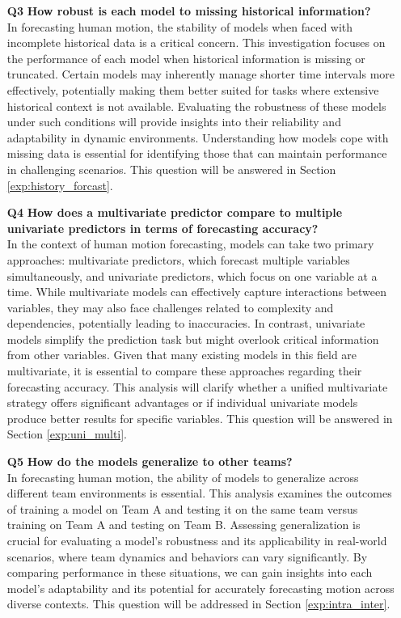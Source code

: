 \begin{itemize}
    
\item[\textbf{Q3}] \textbf{How robust is each model to missing historical information?} \\
In forecasting human motion, the stability of models when faced with incomplete historical data is a critical concern. This investigation focuses on the performance of each model when historical information is missing or truncated. Certain models may inherently manage shorter time intervals more effectively, potentially making them better suited for tasks where extensive historical context is not available. Evaluating the robustness of these models under such conditions will provide insights into their reliability and adaptability in dynamic environments. Understanding how models cope with missing data is essential for identifying those that can maintain performance in challenging scenarios. This question will be answered in Section \ref{exp:history_forcast}.


\item[\textbf{Q4}] \textbf{How does a multivariate predictor compare to multiple univariate predictors in terms of forecasting accuracy?} \\
In the context of human motion forecasting, models can take two primary approaches: multivariate predictors, which forecast multiple variables simultaneously, and univariate predictors, which focus on one variable at a time. While multivariate models can effectively capture interactions between variables, they may also face challenges related to complexity and dependencies, potentially leading to inaccuracies. In contrast, univariate models simplify the prediction task but might overlook critical information from other variables. Given that many existing models in this field are multivariate, it is essential to compare these approaches regarding their forecasting accuracy. This analysis will clarify whether a unified multivariate strategy offers significant advantages or if individual univariate models produce better results for specific variables. This question will be answered in Section \ref{exp:uni_multi}.


\item[\textbf{Q5}] \textbf{How do the models generalize to other teams?} \\
In forecasting human motion, the ability of models to generalize across different team environments is essential. This analysis examines the outcomes of training a model on Team A and testing it on the same team versus training on Team A and testing on Team B. Assessing generalization is crucial for evaluating a model’s robustness and its applicability in real-world scenarios, where team dynamics and behaviors can vary significantly. By comparing performance in these situations, we can gain insights into each model’s adaptability and its potential for accurately forecasting motion across diverse contexts. This question will be addressed in Section \ref{exp:intra_inter}.



\end{itemize}
